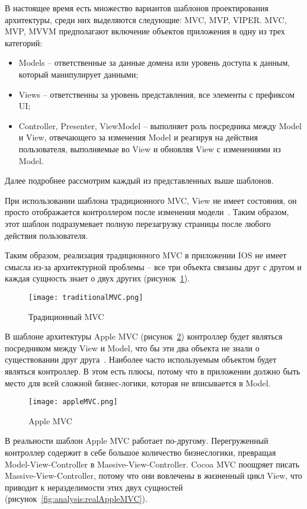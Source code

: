 В настоящее время есть множество вариантов шаблонов проектирования
архитектуры, среди них выделяются следующие: MVC, MVP, VIPER.
MVC, MVP, MVVM предполагают включение объектов приложения в
одну из трех категорий: 
\begin{itemize}
	\item Models -- ответственные за данные домена или уровень доступа к
	данным, который манипулирует данными;
	\item Views -- ответственны за уровень представления, все элементы с префиксом UI;
	\item Controller, Presenter, ViewModel -- выполняет роль посредника
	между Model и View, отвечающего за изменения Model и реагируя на действия
	пользователя, выполняемые во View и обновляя View с изменениями из Model.
\end{itemize}

Далее подробнее рассмотрим каждый из представленных выше
шаблонов.

При использовании шаблона традиционного MVC, View не имеет
состояния, он просто отображается контроллером после изменения модели~\cite{mvc}.
Таким образом, этот шаблон подразумевает полную перезагрузку страницы
после любого действия пользователя.

Таким образом, реализация традиционного MVC в приложении IOS не
имеет смысла из-за архитектурной проблемы – все три объекта связаны друг с
другом и каждая сущность знает о двух других (рисунок~\ref{fig:analysis:tradMvc}).

\begin{figure}[H]
	\centering
	\texttt{[image: traditionalMVC.png]} 
	\caption{Традиционный MVC}
	\label{fig:analysis:tradMvc}
\end{figure}

В шаблоне архитектуры Apple MVC (рисунок~\ref{fig:analysis:appleMVC}) контроллер будет являться
посредником между View и Model, что бы эти два объекта не знали о
существовании друг друга~\cite{mvcApple}. Наиболее часто используемым объектом будет
являться контроллер. В этом есть плюсы, потому что в приложении должно
быть место для всей сложной бизнес-логики, которая не вписывается в Model. 

\begin{figure}[H]
	\centering
	\texttt{[image: appleMVC.png]} 
	\caption{Apple MVC}
	\label{fig:analysis:appleMVC}
\end{figure}

В реальности шаблон Apple MVC работает по-другому.
Перегруженный контроллер содержит в себе большое количество бизнеслогики, превращая Model-View-Controller в Massive-View-Controller. Cocoa
MVC поощряет писать Massive-View-Controller, потому что они вовлечены в жизненный цикл View, что приводит к неразделимости
этих двух сущностей (рисунок~\ref{fig:analysis:realAppleMVC}). 

